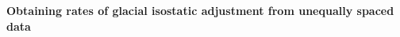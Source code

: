 \documentclass{article}
\begin{document}
\textbf{{Obtaining rates of glacial isostatic adjustment from unequally spaced data\\}}

\newpage
\end{document}

